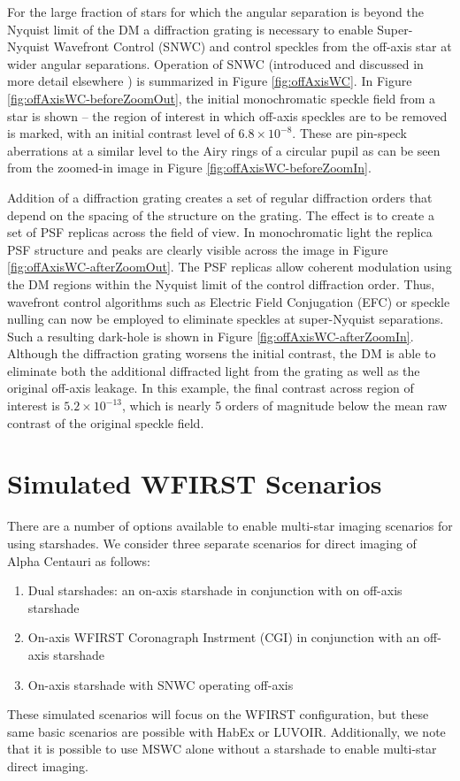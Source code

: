 \documentclass[]{spie}  %
\begin{document}
For the large fraction of stars for which the angular separation is beyond the Nyquist limit of the DM a diffraction grating is necessary to enable Super-Nyquist Wavefront Control (SNWC) and control speckles from the off-axis star at wider angular separations. Operation of SNWC (introduced and discussed in more detail elsewhere \cite{Thomas15}) is summarized in Figure \ref{fig:offAxisWC}. In Figure \ref{fig:offAxisWC-beforeZoomOut}, the initial monochromatic speckle field from a star is shown -- the region of interest in which off-axis speckles are to be removed is marked, with an initial contrast level of $6.8 \times 10^{-8}$. These are pin-speck aberrations at a similar level to the Airy rings of a circular pupil as can be seen from the zoomed-in image in Figure \ref{fig:offAxisWC-beforeZoomIn}.   

Addition of a diffraction grating creates a set of regular diffraction orders that depend on the spacing of the structure on the grating. The effect is to create a set of PSF replicas across the field of view. In monochromatic light the replica PSF structure and peaks are clearly visible across the image in Figure \ref{fig:offAxisWC-afterZoomOut}. The PSF replicas allow coherent modulation using the DM regions within the Nyquist limit of the control diffraction order. Thus, wavefront control algorithms such as Electric Field Conjugation (EFC) or speckle nulling can now be employed to eliminate speckles at super-Nyquist separations. Such a resulting dark-hole is shown in Figure \ref{fig:offAxisWC-afterZoomIn}. Although the diffraction grating worsens the initial contrast, the DM is able to eliminate both the additional diffracted light from the grating as well as the original off-axis leakage. In this example, the final contrast across region of interest is $5.2 \times 10^{-13}$, which is nearly 5 orders of magnitude below the mean raw contrast of the original speckle field. 

\section{Simulated WFIRST Scenarios} \label{sect:wfirst}

There are a number of options available to enable multi-star imaging scenarios for using starshades. We consider three separate scenarios for direct imaging of Alpha Centauri as follows:
\begin{enumerate}
\item Dual starshades: an on-axis starshade in conjunction with on off-axis starshade
\item On-axis WFIRST Coronagraph Instrment (CGI) in conjunction with an off-axis starshade
\item On-axis starshade with SNWC operating off-axis 
\end{enumerate}
These simulated scenarios will focus on the WFIRST configuration, but these same basic scenarios are possible with HabEx or LUVOIR. Additionally, we note that it is possible to use MSWC alone without a starshade to enable multi-star direct imaging. 
\end{document}
